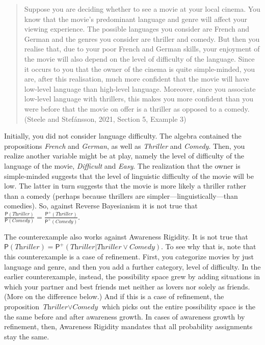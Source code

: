 \documentclass[
  11pt,
  dvipsnames,enabledeprecatedfontcommands]{scrartcl}
\newcommand{\pr}[1]{\ensuremath{\mathsf{P}(#1)}}
\newcommand{\ppr}[2]{\ensuremath{\mathsf{P}^{#1}(#2)}}
\begin{document}
\begin{quote}
Suppose you are deciding whether to see a movie at your local cinema.
You know that the movie's predominant language and genre will affect
your viewing experience. The possible languages you consider are French
and German and the genres you consider are thriller and comedy. But then
you realise that, due to your poor French and German skills, your
enjoyment of the movie will also depend on the level of difficulty of
the language. Since it occurs to you that the owner of the cinema is
quite simple-minded, you are, after this realisation, much more
confident that the movie will have low-level language than high-level
language. Moreover, since you associate low-level language with
thrillers, this makes you more confident than you were before that the
movie on offer is a thriller as opposed to a comedy. (Steele and
Stefánsson, 2021, Section 5, Example 3)
\end{quote}

\noindent Initially, you did not consider language difficulty. The
algebra contained the propositions \textit{French} and \textit{German},
as well as \textit{Thriller} and \textit{Comedy}. Then, you realize
another variable might be at play, namely the level of difficulty of the
language of the movie, \textit{Difficult} and \textit{Easy}. The
realization that the owner is simple-minded suggests that the level of
linguistic difficulty of the movie will be low. The latter in turn
suggests that the movie is more likely a thriller rather than a comedy
(perhaps because thrillers are simpler---linguistically---than
comedies). So, against Reverse Bayesianism it is not true that
\(\frac{\pr{\textit{Thriller}}}{\pr{\textit{Comedy}}}=\frac{\ppr{+}{\textit{Thriller}}}{\ppr{+}{\textit{Comedy}}}\).

The counterexample also works against Awareness Rigidity. It is not true
that
\(\pr{\textit{Thriller}}=\ppr{+}{\textit{Thriller} \vert \textit{Thriller}\vee \textit{Comedy}}\).
To see why that is, note that this counterexample is a case of
refinement. First, you categorize movies by just language and genre, and
then you add a further category, level of difficulty. In the earlier
counterexample, instead, the possibility space grew by adding situations
in which your partner and best friends met neither as lovers nor solely
as friends. (More on the difference below.) And if this is a case of
refinement, the proposition \(\textit{Thriller}\vee \textit{Comedy}\)
which picks out the entire possibility space is the the same before and
after awareness growth. In cases of awareness growth by refinement,
then, Awareness Rigidity mandates that all probability assignments stay
the same.
\end{document}
